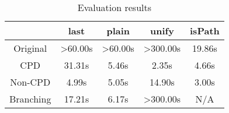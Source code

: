 \begin{table}
  \centering
  \begin{tabular}{c|c|c||c||c}
                   & last & plain & unify & isPath \\
  \hline\hline
  Original         & >60.00s & >60.00s & >300.00s & 19.86s \\
  \hline
  CPD              & 31.31s & 5.46s & 2.35s & 4.66s \\
  \hline
  Non-CPD          & 4.99s  & 5.05s & 14.90s & 3.00s \\
  \hline
  Branching        & 17.21s  & 6.17s & >300.00s & N/A \\
  \hline
  \end{tabular}

  \caption{Evaluation results}
  \label{tbl:eval}
\end{table}







